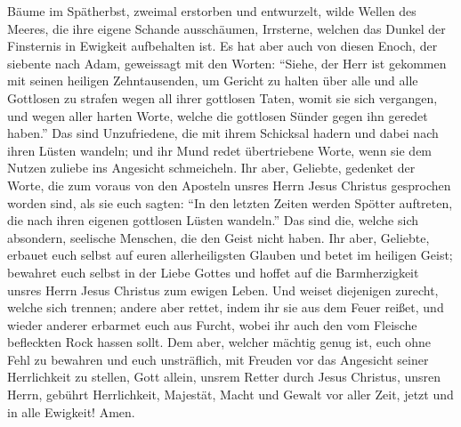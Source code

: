 Bäume im Spätherbst, zweimal erstorben und entwurzelt, 
wilde Wellen des Meeres, die ihre eigene Schande ausschäumen, Irrsterne,
welchen das Dunkel der Finsternis in Ewigkeit aufbehalten ist.
 Es hat aber auch von diesen Enoch, der siebente nach
Adam, geweissagt mit den Worten:  ``Siehe, der Herr ist
gekommen mit seinen heiligen Zehntausenden, um Gericht zu halten über
alle und alle Gottlosen zu strafen wegen all ihrer gottlosen Taten,
womit sie sich vergangen, und wegen aller harten Worte, welche die
gottlosen Sünder gegen ihn geredet haben.''  Das sind
Unzufriedene, die mit ihrem Schicksal hadern und dabei nach ihren Lüsten
wandeln; und ihr Mund redet übertriebene Worte, wenn sie dem Nutzen
zuliebe ins Angesicht schmeicheln.  Ihr aber, Geliebte,
gedenket der Worte, die zum voraus von den Aposteln unsres Herrn Jesus
Christus gesprochen worden sind,  als sie euch sagten:
``In den letzten Zeiten werden Spötter auftreten, die nach ihren eigenen
gottlosen Lüsten wandeln.''  Das sind die, welche sich
absondern, seelische Menschen, die den Geist nicht haben.
 Ihr aber, Geliebte, erbauet euch selbst auf euren
allerheiligsten Glauben und betet im heiligen Geist; 
bewahret euch selbst in der Liebe Gottes und hoffet auf die
Barmherzigkeit unsres Herrn Jesus Christus zum ewigen Leben.
 Und weiset diejenigen zurecht, welche sich trennen;
 andere aber rettet, indem ihr sie aus dem Feuer reißet,
und wieder anderer erbarmet euch aus Furcht, wobei ihr auch den vom
Fleische befleckten Rock hassen sollt.  Dem aber, welcher
mächtig genug ist, euch ohne Fehl zu bewahren und euch unsträflich, mit
Freuden vor das Angesicht seiner Herrlichkeit zu stellen,
 Gott allein, unsrem Retter durch Jesus Christus, unsren
Herrn, gebührt Herrlichkeit, Majestät, Macht und Gewalt vor aller Zeit,
jetzt und in alle Ewigkeit! Amen.
